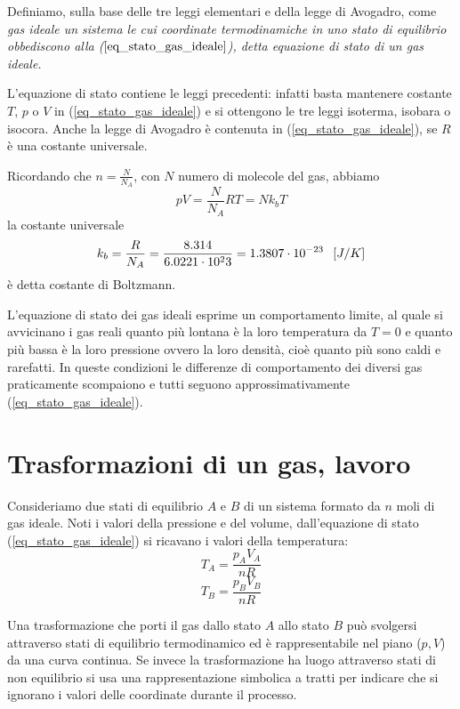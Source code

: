 \documentclass[class=book, crop=false, oneside, 12pt]{standalone}
\begin{document}
Definiamo, sulla base delle tre leggi elementari e della legge di Avogadro, come \emph{gas ideale un sistema le cui coordinate termodinamiche in uno stato di equilibrio obbediscono alla (\(\ref{eq_stato_gas_ideale}\)), detta equazione di stato di un gas ideale.}

L'equazione di stato contiene le leggi precedenti: infatti basta mantenere costante \(T\), \(p\) o \(V\) in (\ref{eq_stato_gas_ideale})  e si ottengono le tre leggi isoterma, isobara o isocora. 
Anche la legge di Avogadro è contenuta in (\ref{eq_stato_gas_ideale}), se \(R\) è una costante universale.

Ricordando che \(n = \frac{N}{N_A}\), con \(N\) numero di molecole del gas, abbiamo 
\begin{equation}
    p V = \frac{N}{N_A} R T = N k_b T
\end{equation}
la costante universale
\begin{equation}
    k_b = \frac{R}{N_A} = \frac{8.314}{6.0221 \cdot 10^23} = 1.3807 \cdot 10^{-23} \hspace{0.2cm} \left[J/K\right]
\end{equation}
è detta costante di Boltzmann.

L'equazione di stato dei gas ideali esprime un comportamento limite, al quale si avvicinano i gas reali quanto più lontana è la loro temperatura da \(T = 0\) e quanto più bassa è la loro pressione ovvero la loro densità, cioè quanto più sono caldi e rarefatti. 
In queste condizioni le differenze di comportamento dei diversi gas praticamente scompaiono e tutti seguono approssimativamente (\ref{eq_stato_gas_ideale}).

\section{Trasformazioni di un gas, lavoro}

Consideriamo due stati di equilibrio \(A\) e \(B\) di un sistema formato da \(n\) moli di gas ideale. 
Noti i valori della pressione e del volume, dall'equazione di stato (\ref{eq_stato_gas_ideale}) si ricavano i valori della temperatura:
\begin{equation*}
    T_A = \frac{p_A V_A}{n R}
\end{equation*}
\begin{equation*}
    T_B = \frac{p_B V_B}{n R}
\end{equation*}

Una trasformazione che porti il gas dallo stato \(A\) allo stato \(B\) può svolgersi attraverso stati di equilibrio termodinamico ed è rappresentabile nel piano (\(p , V\)) da una curva continua.
Se invece la trasformazione ha luogo attraverso stati di non equilibrio si usa una rappresentazione simbolica a tratti per indicare che si ignorano i valori delle coordinate durante il processo.
\end{document}
